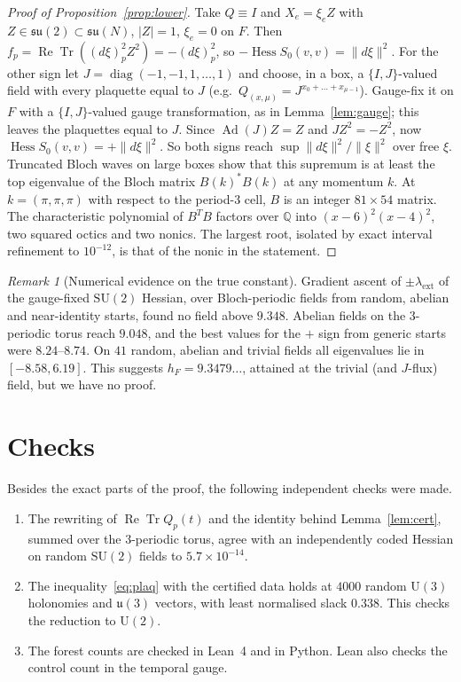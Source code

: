 \documentclass[11pt]{amsart}
\theoremstyle{definition}
\theoremstyle{remark}
\newtheorem{remark}[theorem]{Remark}
\newcommand{\Tr}{\operatorname{Tr}}
\renewcommand{\Re}{\operatorname{Re}}
\newcommand{\Hess}{\operatorname{Hess}}
\newcommand{\Ad}{\operatorname{Ad}}
\newcommand{\SU}{\mathrm{SU}}
\newcommand{\U}{\mathrm{U}}
\begin{document}
\begin{proof}[Proof of Proposition~\ref{prop:lower}]
Take $Q\equiv I$ and $X_e=\xi_eZ$ with $Z\in\mathfrak{su}(2)\subset\mathfrak{su}(N)$, $|Z|=1$, $\xi_e=0$ on $F$.
Then $f_p=\Re\Tr((d\xi)_p^2Z^2)=-(d\xi)_p^2$, so $-\Hess S_0(v,v)=\|d\xi\|^2$. For the other sign let
$J=\operatorname{diag}(-1,-1,1,\dots,1)$ and choose, in a box, a $\{I,J\}$-valued field with every plaquette equal to
$J$ (e.g.\ $Q_{(x,\mu)}=J^{x_0+\dots+x_{\mu-1}}$). Gauge-fix it on $F$ with a $\{I,J\}$-valued gauge transformation, as in
Lemma~\ref{lem:gauge}; this leaves the plaquettes equal to $J$. Since $\Ad(J)Z=Z$ and $JZ^2=-Z^2$, now
$\Hess S_0(v,v)=+\|d\xi\|^2$. So both signs reach $\sup\|d\xi\|^2/\|\xi\|^2$ over free $\xi$. Truncated Bloch waves
on large boxes show that this supremum is at least the top eigenvalue of the Bloch matrix $B(k)^*B(k)$ at any
momentum $k$. At $k=(\pi,\pi,\pi)$ with respect to the period-$3$ cell, $B$ is an integer $81\times54$ matrix. The
characteristic polynomial of $B^TB$ factors over $\mathbb{Q}$ into $(x-6)^2(x-4)^2$, two squared octics and two
nonics. The largest root, isolated by exact interval refinement to $10^{-12}$, is that of the nonic in the statement.
\end{proof}

\begin{remark}[Numerical evidence on the true constant]
Gradient ascent of $\pm\lambda_{\mathrm{ext}}$ of the gauge-fixed $\SU(2)$ Hessian, over Bloch-periodic fields from
random, abelian and near-identity starts, found no field above $9.348$. Abelian fields on the $3$-periodic torus
reach $9.048$, and the best values for the $+$ sign from generic starts were $8.24$--$8.74$. On $41$ random,
abelian and trivial fields all eigenvalues lie in $[-8.58,6.19]$. This suggests $h_F=9.3479\ldots$, attained at the
trivial (and $J$-flux) field, but we have no proof.
\end{remark}

\section{Checks}

Besides the exact parts of the proof, the following independent checks were made.
\begin{enumerate}
\item The rewriting of $\Re\Tr Q_p(t)$ and the identity behind Lemma~\ref{lem:cert}, summed over the $3$-periodic
torus, agree with an independently coded Hessian on random $\SU(2)$ fields to $5.7\times10^{-14}$.
\item The inequality~\eqref{eq:plaq} with the certified data holds at $4000$ random $\U(3)$ holonomies and
$\mathfrak u(3)$ vectors, with least normalised slack $0.338$. This checks the reduction to $\U(2)$.
\item The forest counts are checked in Lean~4 and in Python. Lean also checks the control count in the temporal gauge.
\end{enumerate}
\end{document}
